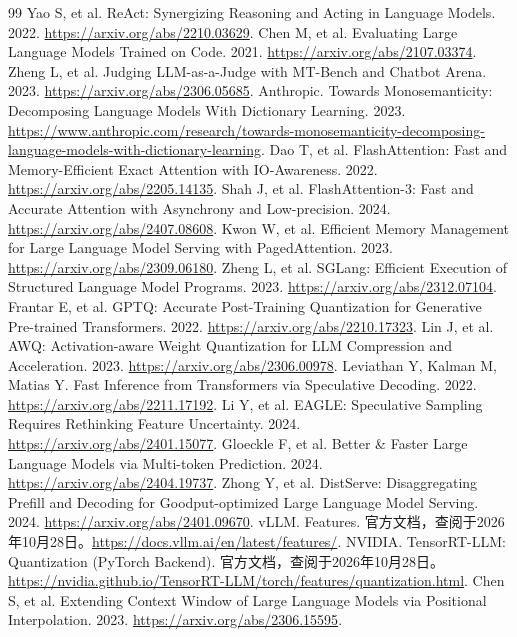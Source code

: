 \documentclass[UTF8,12pt,a4paper,fontset=fandol]{ctexbook}
\begin{document}
\begin{thebibliography}{99}
 Yao S, et al. ReAct: Synergizing Reasoning and Acting in Language Models. 2022. \url{https://arxiv.org/abs/2210.03629}.
 Chen M, et al. Evaluating Large Language Models Trained on Code. 2021. \url{https://arxiv.org/abs/2107.03374}.
 Zheng L, et al. Judging LLM-as-a-Judge with MT-Bench and Chatbot Arena. 2023. \url{https://arxiv.org/abs/2306.05685}.
 Anthropic. Towards Monosemanticity: Decomposing Language Models With Dictionary Learning. 2023. \url{https://www.anthropic.com/research/towards-monosemanticity-decomposing-language-models-with-dictionary-learning}.
 Dao T, et al. FlashAttention: Fast and Memory-Efficient Exact Attention with IO-Awareness. 2022. \url{https://arxiv.org/abs/2205.14135}.
 Shah J, et al. FlashAttention-3: Fast and Accurate Attention with Asynchrony and Low-precision. 2024. \url{https://arxiv.org/abs/2407.08608}.
 Kwon W, et al. Efficient Memory Management for Large Language Model Serving with PagedAttention. 2023. \url{https://arxiv.org/abs/2309.06180}.
 Zheng L, et al. SGLang: Efficient Execution of Structured Language Model Programs. 2023. \url{https://arxiv.org/abs/2312.07104}.
 Frantar E, et al. GPTQ: Accurate Post-Training Quantization for Generative Pre-trained Transformers. 2022. \url{https://arxiv.org/abs/2210.17323}.
 Lin J, et al. AWQ: Activation-aware Weight Quantization for LLM Compression and Acceleration. 2023. \url{https://arxiv.org/abs/2306.00978}.
 Leviathan Y, Kalman M, Matias Y. Fast Inference from Transformers via Speculative Decoding. 2022. \url{https://arxiv.org/abs/2211.17192}.
 Li Y, et al. EAGLE: Speculative Sampling Requires Rethinking Feature Uncertainty. 2024. \url{https://arxiv.org/abs/2401.15077}.
 Gloeckle F, et al. Better \& Faster Large Language Models via Multi-token Prediction. 2024. \url{https://arxiv.org/abs/2404.19737}.
 Zhong Y, et al. DistServe: Disaggregating Prefill and Decoding for Goodput-optimized Large Language Model Serving. 2024. \url{https://arxiv.org/abs/2401.09670}.
 vLLM. Features. 官方文档，查阅于2026年10月28日。\url{https://docs.vllm.ai/en/latest/features/}.
 NVIDIA. TensorRT-LLM: Quantization (PyTorch Backend). 官方文档，查阅于2026年10月28日。\url{https://nvidia.github.io/TensorRT-LLM/torch/features/quantization.html}.
 Chen S, et al. Extending Context Window of Large Language Models via Positional Interpolation. 2023. \url{https://arxiv.org/abs/2306.15595}.

\end{thebibliography}
\end{document}
